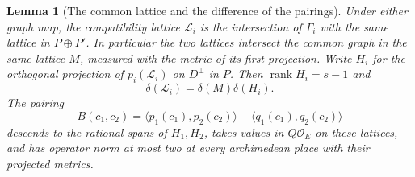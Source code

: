 \documentclass[a4paper,11pt]{article}
\newtheorem{lemma}[proposition]{Lemma}
\theoremstyle{definition}
\theoremstyle{remark}
\numberwithin{equation}{section}
\newcommand{\OO}{\mathcal O}
\begin{document}
\begin{lemma}[The common lattice and the difference of the pairings]
\label{lem:graphs223}
Under either graph map, the compatibility lattice
\(\mathcal L_i\) is the intersection of \(\Gamma_i\) with
the same lattice in \(P\oplus P'\). In particular the two
lattices intersect the common graph in the same lattice
\(M\), measured with the metric of its first projection.
Write \(H_i\) for the orthogonal projection of
\(p_i(\mathcal L_i)\) on \(D^\perp\) in \(P\). Then
\(\operatorname{rank}H_i=s-1\) and
\[
                       \delta(\mathcal L_i)=\delta(M)\delta(H_i).
\]
The pairing
\[
       B(c_1,c_2)=
         \langle p_1(c_1),p_2(c_2)\rangle
            -\langle q_1(c_1),q_2(c_2)\rangle
\]
descends to the rational spans of \(H_1,H_2\), takes values
in \(Q\OO_E\) on these lattices, and has operator norm at
most two at every archimedean place with their projected metrics.
\end{lemma}
\end{document}
